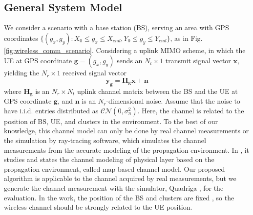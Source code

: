\documentclass[12pt, draftcls, onecolumn]{IEEEtran}
\theoremstyle{plain}
\theoremstyle{definition}
\theoremstyle{remark}
\newcommand{\nt}[1]{\textcolor{red}{\textbf{[#1]}}}
\begin{document}
\subsection{General System Model}
We consider a scenario with a base station (BS), serving an area with GPS coordinates $\{(g_x,g_y):X_0\leq g_x\leq X_{end},Y_0\leq g_y \leq Y_{end}\}$, as in Fig. \ref{fig:wireless_comm_scenario}.
Considering a uplink MIMO scheme, in which the UE at GPS coordinate $\mathbf g=(g_x,g_y)$ sends an $N_t\times 1$ transmit signal vector $\mathbf x$, yielding the $N_r\times 1$ received signal vector 
\begin{equation}
    \mathbf{y}_{\mathbf g}=\mathbf{H}_{\mathbf g}\mathbf{x} + \mathbf{n}
\end{equation}
where $\mathbf{H}_{\mathbf g}$ is an $N_r\times N_t$ uplink channel matrix between the BS and the UE at GPS coordinate $\mathbf g$, and $\mathbf{n}$ is an $N_r$-dimensional noise.
Assume that the noise to have i.i.d. entries distributed as $\mathcal{CN}(0,\sigma_n^2)$.
Here, the channel is related to the position of BS, UE, and clusters in the environment.
To the best of our knowledge, this channel model can only be done by real channel measurements or the simulation by ray-tracing software, which simulates the channel measurements from the accurate modeling of the propagation environment.
In \cite{3gpp.38.901}, it studies and states the channel modeling of physical layer based on the propagation environment, called map-based channel model.
Our proposed algorithm is applicable to the channel acquired by real measurements, but we generate the channel measurement with the simulator, Quadriga \cite{6758357}, for the evaluation.
In the work, the position of the BS and clusters are fixed , so the wireless channel should be strongly related to the UE position.
\end{document}
